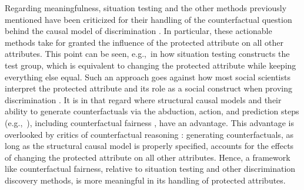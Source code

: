Regarding meaningfulness, situation testing and the other methods previously mentioned have been criticized for their handling of the counterfactual question behind the causal model of discrimination \parencite{Kohler2018CausalEddie, Hu_facct_sex_20, Kasirzadeh2021UseMisuse}. In particular, these actionable methods take for granted the influence of the protected attribute on all other attributes. This point can be seen, e.g.,~in how situation testing constructs the test group, which is equivalent to changing the protected attribute while keeping everything else equal. Such an approach goes against how most social scientists interpret the protected attribute and its role as a social construct when proving discrimination \parencite{Bonilla1997_RethinkingRace, rose_constructivist_2022, Sen2016_RaceABundle, Hanna2020_CriticalRace}. 
It is in that regard where structural causal models \parencite{PearlCausality2009} and their ability to generate counterfactuals via the abduction, action, and prediction steps (e.g.,~\textcite{Chiappa2019_PathCF, Yang2021_CausalIntersectionality}), including counterfactual fairness \parencite{Kusner2017CF}, have an advantage.
This advantage is overlooked by critics of counterfactual reasoning \parencite{Kasirzadeh2021UseMisuse, Hu_facct_sex_20}: generating counterfactuals, as long as the structural causal model is properly specified, accounts for the effects of changing the protected attribute on all other attributes. 
Hence, a framework like counterfactual fairness, relative to situation testing and other discrimination discovery methods, is more meaningful in its handling of protected attributes. 


